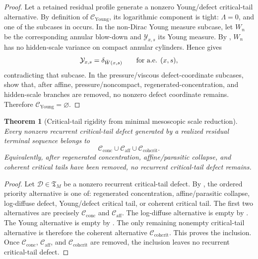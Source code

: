 \documentclass[11pt]{amsart}
\numberwithin{equation}{section}
\theoremstyle{plain}
\newtheorem{theorem}{Theorem}[section]
\theoremstyle{definition}
\theoremstyle{remark}
\newcommand{\Cactive}{\mathcal C_{\mathrm{conc}}}
\newcommand{\Caff}{\mathcal C_{\mathrm{aff}}}
\newcommand{\Ccohcrit}{\mathcal C_{\mathrm{cohcrit}}}
\newcommand{\Tcrit}{\mathfrak T_M}
\newcommand{\Cyoung}{\mathcal C_{\mathrm{Young}}}
\begin{document}
\begin{proof}
Let a retained residual profile generate a nonzero Young/defect critical-tail alternative.
By definition of \(\Cyoung\), its logarithmic component is tight:
\(\Lambda=0\), and one of the subcases in
 occurs.  In the non-Dirac Young
measure subcase, let \(W_n\) be the corresponding annular blow-down and
\(\mathcal Y_{x,s}\) its Young measure.  By
,
\(W_n\) has no hidden-scale variance on compact annular cylinders.  Hence
 gives
\[
   \mathcal Y_{x,s}=\delta_{\bar W(x,s)}
   \qquad\hbox{for a.e. }(x,s),
\]
contradicting that subcase.  In the pressure/viscous defect-coordinate subcases,
show that, after affine, pressure/noncompact, regenerated-concentration, and
hidden-scale branches are removed, no nonzero defect coordinate remains.
Therefore
\(\Cyoung=\varnothing\).
\end{proof}

\begin{theorem}[Critical-tail rigidity from minimal mesoscopic scale reduction]
\label{thm:remaining-rigidity-exact-form}
Every nonzero recurrent critical-tail defect generated by a realized residual
terminal sequence belongs to
\[
   \Cactive\cup\Caff\cup\Ccohcrit .
\]
Equivalently, after regenerated concentration, affine/parasitic collapse, and
coherent critical tails have been removed, no recurrent critical-tail defect
remains.
\end{theorem}

\begin{proof}
Let \(\mathcal D\in\Tcrit\) be a nonzero recurrent critical-tail defect.  By
, the ordered priority alternative is
one of: regenerated concentration, affine/parasitic collapse, log-diffuse defect,
Young/defect critical tail, or coherent critical tail.  The first two alternatives are
precisely \(\Cactive\) and \(\Caff\).  The log-diffuse alternative is empty by
.  The Young alternative is empty by
.  The only remaining nonempty critical-tail
alternative is therefore the coherent alternative \(\Ccohcrit\).  This proves the
inclusion.  Once \(\Cactive\), \(\Caff\), and \(\Ccohcrit\) are removed, the
inclusion leaves no recurrent critical-tail defect.
\end{proof}
\end{document}
